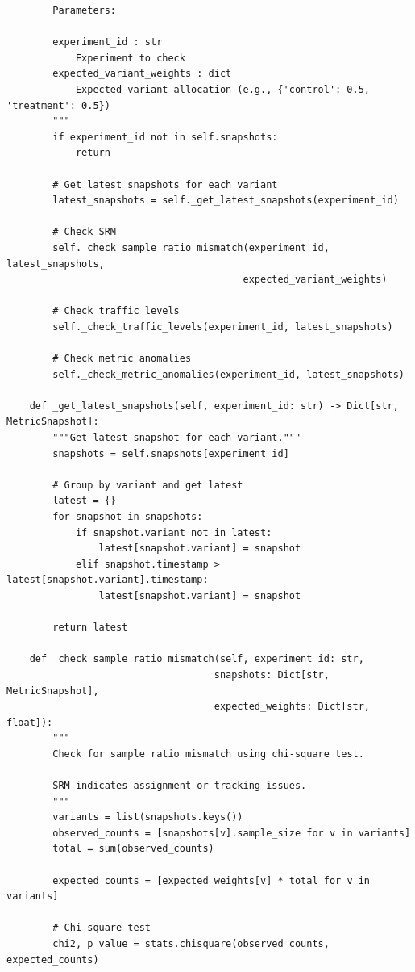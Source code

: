 \begin{lstlisting}
        Parameters:
        -----------
        experiment_id : str
            Experiment to check
        expected_variant_weights : dict
            Expected variant allocation (e.g., {'control': 0.5, 'treatment': 0.5})
        """
        if experiment_id not in self.snapshots:
            return

        # Get latest snapshots for each variant
        latest_snapshots = self._get_latest_snapshots(experiment_id)

        # Check SRM
        self._check_sample_ratio_mismatch(experiment_id, latest_snapshots,
                                         expected_variant_weights)

        # Check traffic levels
        self._check_traffic_levels(experiment_id, latest_snapshots)

        # Check metric anomalies
        self._check_metric_anomalies(experiment_id, latest_snapshots)

    def _get_latest_snapshots(self, experiment_id: str) -> Dict[str, MetricSnapshot]:
        """Get latest snapshot for each variant."""
        snapshots = self.snapshots[experiment_id]

        # Group by variant and get latest
        latest = {}
        for snapshot in snapshots:
            if snapshot.variant not in latest:
                latest[snapshot.variant] = snapshot
            elif snapshot.timestamp > latest[snapshot.variant].timestamp:
                latest[snapshot.variant] = snapshot

        return latest

    def _check_sample_ratio_mismatch(self, experiment_id: str,
                                    snapshots: Dict[str, MetricSnapshot],
                                    expected_weights: Dict[str, float]):
        """
        Check for sample ratio mismatch using chi-square test.

        SRM indicates assignment or tracking issues.
        """
        variants = list(snapshots.keys())
        observed_counts = [snapshots[v].sample_size for v in variants]
        total = sum(observed_counts)

        expected_counts = [expected_weights[v] * total for v in variants]

        # Chi-square test
        chi2, p_value = stats.chisquare(observed_counts, expected_counts)


\end{lstlisting}
